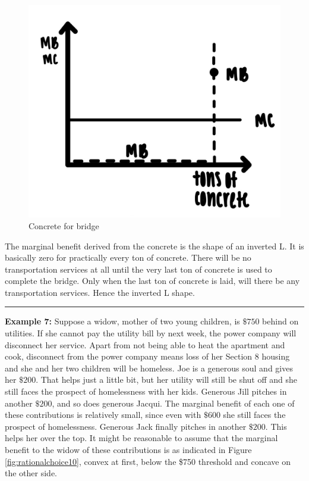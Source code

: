 \documentclass[
]{book}
\begin{document}
\begin{figure}

{\centering \includegraphics[width=0.75\linewidth]{img/rationalchoice/fig9} 

}

\caption{Concrete for bridge}\label{fig:rationalchoice09}
\end{figure}

The marginal benefit derived from the concrete is the shape of an inverted L. It is basically zero for practically every ton of concrete. There will be no transportation services at all until the very last ton of concrete is used to complete the bridge. Only when the last ton of concrete is laid, will there be any transportation services. Hence the inverted L shape.

\begin{center}\rule{0.5\linewidth}{0.5pt}\end{center}

\textbf{Example 7:} Suppose a widow, mother of two young children, is \(\$750\) behind on utilities. If she cannot pay the utility bill by next week, the power company will disconnect her service. Apart from not being able to heat the apartment and cook, disconnect from the power company means loss of her Section 8 housing and she and her two children will be homeless. Joe is a generous soul and gives her \(\$200\). That helps just a little bit, but her utility will still be shut off and she still faces the prospect of homelessness with her kids. Generous Jill pitches in another \(\$200\), and so does generous Jacqui. The marginal benefit of each one of these contributions is relatively small, since even with \(\$600\) she still faces the prospect of homelessness. Generous Jack finally pitches in another \(\$200\). This helps her over the top. It might be reasonable to assume that the marginal benefit to the widow of these contributions is as indicated in Figure \ref{fig:rationalchoice10}, convex at first, below the \$750 threshold and concave on the other side.
\end{document}
